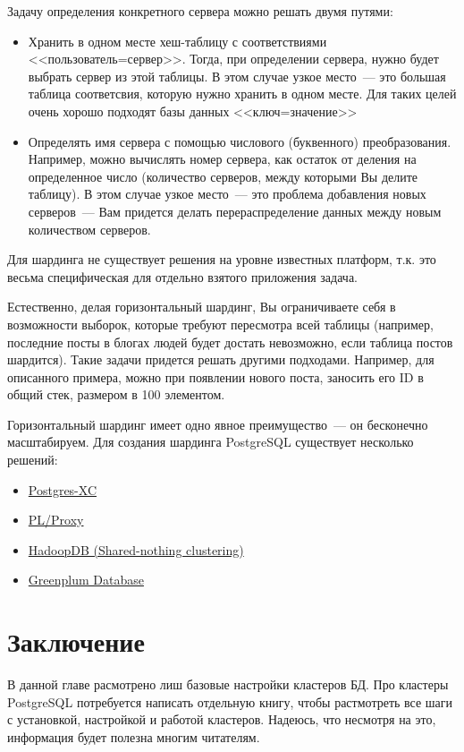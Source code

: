 Задачу определения конкретного сервера можно решать двумя путями:
\begin{itemize}
\item Хранить в одном месте хеш-таблицу с соответствиями <<пользователь=сервер>>. Тогда, при определении сервера, нужно будет 
выбрать сервер из этой таблицы. В этом случае узкое место~--- это большая таблица соответсвия, которую нужно хранить в одном месте. 
Для таких целей очень хорошо подходят базы данных <<ключ=значение>>
\item Определять имя сервера с помощью числового (буквенного) преобразования. Например, можно вычислять номер сервера, 
как остаток от деления на определенное число (количество серверов, между которыми Вы делите таблицу). В этом случае узкое место~--- 
это проблема добавления новых серверов~--- Вам придется делать перераспределение данных между новым количеством серверов.
\end{itemize}

Для шардинга не существует решения на уровне известных платформ, т.к. это весьма специфическая для отдельно взятого приложения задача.

Естественно, делая горизонтальный шардинг, Вы ограничиваете себя в возможности выборок, которые требуют 
пересмотра всей таблицы (например, последние посты в блогах людей будет достать невозможно, если таблица постов шардится). 
Такие задачи придется решать другими подходами. Например, для описанного примера, можно при появлении нового поста, заносить 
его ID в общий стек, размером в 100 элементом.

Горизонтальный шардинг имеет одно явное преимущество~--- он бесконечно масштабируем.
Для создания шардинга PostgreSQL существует несколько решений:
\begin{itemize}
\item \href{http://postgres-xc.sourceforge.net/}{Postgres-XC}
\item \href{http://plproxy.projects.postgresql.org/doc/tutorial.html}{PL/Proxy}
\item \href{http://db.cs.yale.edu/hadoopdb/hadoopdb.html}{HadoopDB (Shared-nothing clustering)}
\item \href{http://www.greenplum.com/products/greenplum-database}{Greenplum Database}
\end{itemize}







\section{Заключение}
В данной главе расмотрено лиш базовые настройки кластеров БД. 
Про кластеры PostgreSQL потребуется написать отдельную книгу, чтобы растмотреть все шаги с установкой, настройкой и работой кластеров.
Надеюсь, что несмотря на это, информация будет полезна многим читателям.